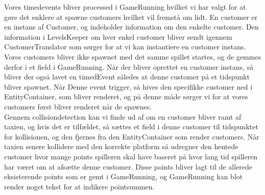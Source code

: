 Vores timedevents bliver processed i GameRunning hvilket vi har valgt for at gøre det enklere at spawne customers hvilket vil fremstå om lidt. En customer er en instans af Customer, og indeholder information om den enkelte customer. Den information i LevelsKeeper om hver enkel customer bliver sendt igennem CustomerTranslator som sørger for at vi kan instantiere en customer instans. Vores customers bliver ikke spawnet med det samme spillet startes, og de gemmes derfor i et field i GameRunning. Når der bliver oprettet en customer instans, så bliver der også lavet en timedEvent således at denne customer på et tidspunkt bliver spawnet. Når Denne event trigger, så hives den specifikke customer ned i EntityContainer, som bliver renderet, og på denne måde sørger vi for at vores customers først bliver renderet når de spawnes.\\
Gennem collisiondetection kan vi finde ud af om en customer bliver ramt af taxien, og hvis det er tilfældet, så sættes et field i denne customer til tidspunktet for kollisionen, og den fjernes fra den EntityContainer som render customers. Når taxien senere kollidere med den korrekte platform så udregner den hentede customer hvor mange points spilleren skal have baseret på hvor lang tid spilleren har været om at afsætte denne customer. Disse points bliver lagt til de allerede eksisterende points som er gemt i GameRunning, og GameRunning kan blot render noget tekst for at indikere pointsummen.
